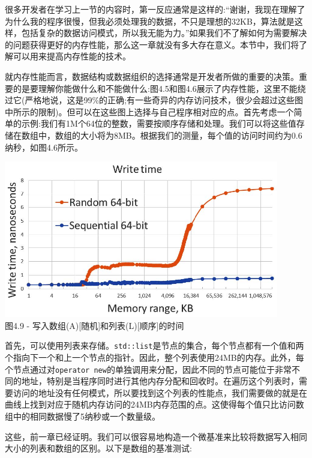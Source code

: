 
很多开发者在学习上一节的内容时，第一反应通常是这样的:“谢谢，我现在理解了为什么我的程序很慢，但我必须处理我的数据，不只是理想的32KB，算法就是这样，包括复杂的数据访问模式，所以我无能为力。”如果我们不了解如何为需要解决的问题获得更好的内存性能，那么这一章就没有多大存在意义。本节中，我们将了解可以用来提高内存性能的技术。


就内存性能而言，数据结构或数据组织的选择通常是开发者所做的重要的决策。重要的是要理解你能做什么和不能做什么:图4.5和图4.6展示了内存性能，这里不能绕过它(严格地说，这是99\%的正确;有一些奇异的内存访问技术，很少会超过这些图中所示的限制)。但可以在这些图上选择与自己程序相对应的点。首先考虑一个简单的示例:我们有1M个64位的整数，需要按顺序存储和处理。我们可以将这些值存储在数组中，数组的大小将为8MB。根据我们的测量，每个值的访问时间约为0.6纳秒，如图4.6所示。

\begin{center}
\includegraphics[width=0.9\textwidth]{content/1/chapter4/images/9.jpg}\\
图4.9 - 写入数组(A)[随机]和列表(L)[顺序]的时间
\end{center}

首先，可以使用列表来存储。\texttt{std::list}是节点的集合，每个节点都有一个值和两个指向下一个和上一个节点的指针。因此，整个列表使用24MB的内存。此外，每个节点通过对\texttt{operator new}的单独调用来分配，因此不同的节点可能位于非常不同的地址，特别是当程序同时进行其他内存分配和回收时。在遍历这个列表时，需要访问的地址没有任何模式，所以要找到这个列表的性能点，我们需要做的就是在曲线上找到对应于随机内存访问的24MB内存范围的点。这使得每个值只比访问数组中的相同数据慢了5纳秒或一个数量级。

这些，前一章已经证明。我们可以很容易地构造一个微基准来比较将数据写入相同大小的列表和数组的区别。以下是数组的基准测试:

